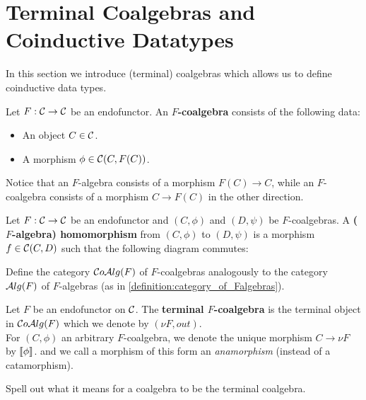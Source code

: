 \section{Terminal Coalgebras and Coinductive Datatypes}
In this section we introduce (terminal) coalgebras which allows us to define coinductive data types.

\begin{dfn} Let $F:\mathcal{C}\to \mathcal{C}$ be an endofunctor. An \textbf{$F$-coalgebra} consists of the following data:
\begin{itemize}
\item An object $C\in \mathcal{C}$.
\item A morphism $\phi \in {\mathcal{C}}(C,F(C))$.
\end{itemize}
\end{dfn}
Notice that an $F$-algebra consists of a morphism $F(C)\to C$, while an $F$-coalgebra consists of a morphism $C\to F(C)$ in the other direction.

\begin{dfn} Let $F:\mathcal{C}\to \mathcal{C}$ be an endofunctor and $(C,\phi)$ and $(D,\psi)$ be $F$-coalgebras. A \textbf{($F$-algebra) homomorphism} from $(C,\phi)$ to $(D,\psi)$ is a morphism $f\in {\mathcal{C}}(C,D)$ such that the following diagram commutes:
\begin{center}
\end{center}
\end{dfn}

\begin{exer} Define the category $\mathcal{C}o\mathcal{A}lg(F)$ of $F$-coalgebras analogously to the category $\mathcal{A}lg(F)$ of $F$-algebras (as in \cref{definition:category_of_Falgebras}).
\end{exer}

\begin{dfn} Let $F$ be an endofunctor on $\mathcal{C}$. The \textbf{terminal $F$-coalgebra} is the terminal object in $\mathcal{C}o\mathcal{A}lg(F)$ which we denote by $(\nu F, out)$.\\
For $(C,\phi)$ an arbitrary $F$-coalgebra, we denote the unique morphism $C\to \nu F$ by $\llbracket \phi \rrbracket$. and we call a morphism of this form an \textit{anamorphism} (instead of a catamorphism).
\end{dfn}

\begin{exer} Spell out what it means for a coalgebra to be the terminal coalgebra.
\end{exer}

